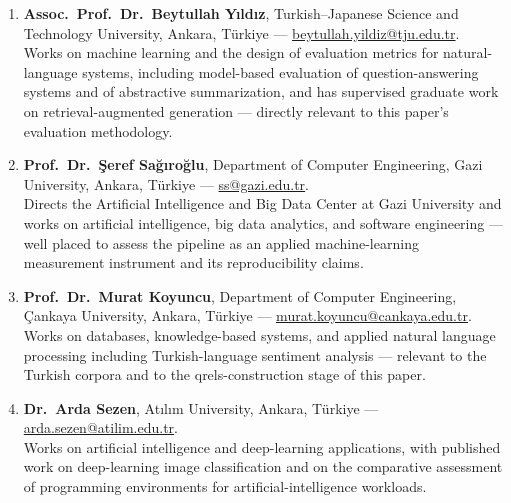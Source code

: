 \documentclass[10pt,a4paper]{article}
\begin{document}
\begin{enumerate}
  \item \textbf{Assoc.\ Prof.\ Dr.\ Beytullah Y{\i}ld{\i}z}, Turkish--Japanese Science and
        Technology University, Ankara, T\"urkiye ---
        \href{mailto:beytullah.yildiz@tju.edu.tr}{beytullah.yildiz@tju.edu.tr}.\\
        Works on machine learning and the design of evaluation metrics for natural-language
        systems, including model-based evaluation of question-answering systems and of
        abstractive summarization, and has supervised graduate work on retrieval-augmented
        generation --- directly relevant to this paper's evaluation methodology.
  \item \textbf{Prof.\ Dr.\ \c{S}eref Sa\u{g}{\i}ro\u{g}lu}, Department of Computer Engineering,
        Gazi University, Ankara, T\"urkiye ---
        \href{mailto:ss@gazi.edu.tr}{ss@gazi.edu.tr}.\\
        Directs the Artificial Intelligence and Big Data Center at Gazi University and works on
        artificial intelligence, big data analytics, and software engineering --- well placed to
        assess the pipeline as an applied machine-learning measurement instrument and its
        reproducibility claims.
  \item \textbf{Prof.\ Dr.\ Murat Koyuncu}, Department of Computer Engineering,
        \c{C}ankaya University, Ankara, T\"urkiye ---
        \href{mailto:murat.koyuncu@cankaya.edu.tr}{murat.koyuncu@cankaya.edu.tr}.\\
        Works on databases, knowledge-based systems, and applied natural language processing
        including Turkish-language sentiment analysis --- relevant to the Turkish corpora and
        to the qrels-construction stage of this paper.
  \item \textbf{Dr.\ Arda Sezen}, At{\i}l{\i}m University, Ankara, T\"urkiye ---
        \href{mailto:arda.sezen@atilim.edu.tr}{arda.sezen@atilim.edu.tr}.\\
        Works on artificial intelligence and deep-learning applications, with published work on
        deep-learning image classification and on the comparative assessment of programming
        environments for artificial-intelligence workloads.
\end{enumerate}
\end{document}
